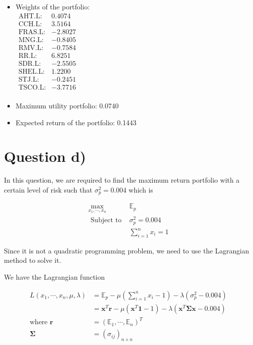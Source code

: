 \documentclass[12pt]{article}
\begin{document}
\begin{itemize}
    \item Weights of the portfolio: \\ \(
          \begin{array}{rr}
              \text{AHT.L:}  & 0.4074  \\
              \text{CCH.L:}  & 3.5164  \\
              \text{FRAS.L:} & -2.8027 \\
              \text{MNG.L:}  & -0.8405 \\
              \text{RMV.L:}  & -0.7584 \\
              \text{RR.L:}   & 6.8251  \\
              \text{SDR.L:}  & -2.5505 \\
              \text{SHEL.L:} & 1.2200  \\
              \text{STJ.L:}  & -0.2451 \\
              \text{TSCO.L:} & -3.7716 \\
          \end{array}
          \)
    \item Maximum utility portfolio: 0.0740
    \item Expected return of the portfolio: 0.1443
\end{itemize}

\section{Question d)}

In this question, we are required to find the maximum return portfolio with a
certain level of risk such that
\(\sigma^2_p = 0.004\) which is

\[\begin{aligned}
        \max _{x_1, \cdots, x_n} & \mathbb{E}_p       \\
        \text { Subject to }     & \sigma^2_p = 0.004 \\
                                 & \sum_{i=1}^n x_i=1
    \end{aligned}\]

Since it is not a quadratic programming problem, we need to use the Lagrangian
method to solve it.

We have the Lagrangian function

\[
    \begin{aligned}
        L(x_1, \cdots, x_n, \mu, \lambda) & =\mathbb{E}_p-\mu\left(\sum_{i=1}^n
        x_i-1\right)-\lambda\left(\sigma^2_p-0.004\right)                                   \\
                                          & =\mathbf{x}^T\mathbf{r} -\mu \left(\mathbf{x}^T
        \mathbf{1}-1\right)-\lambda
        \left(\mathbf{x}^T\mathbf{\Sigma}\mathbf{x}-0.004\right)                            \\
        \text{where } \mathbf{r}          & =\left(\mathbb{E}_1, \cdots,
        \mathbb{E}_n\right)^T                                                               \\
        \mathbf{\Sigma}                   & =\left(\sigma_{i j}\right)_{n \times n}
    \end{aligned}
\]
\end{document}
